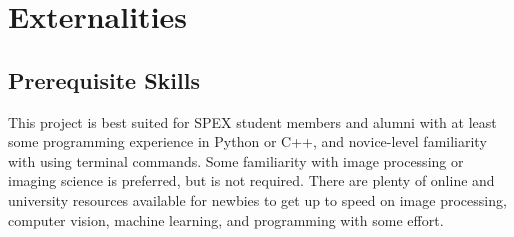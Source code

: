 \documentclass[conference]{IEEEtran} %
\begin{document}

\section{Externalities}
\subsection{Prerequisite Skills}
 This project is best suited for SPEX student members and alumni with at least some programming experience in Python or C++, and novice-level familiarity with using terminal commands.
 Some familiarity with image processing or imaging science is preferred, but is not required.
 There are plenty of online and university resources available for newbies to get up to speed on image processing, computer vision, machine learning, and programming with some effort.
\end{document}
